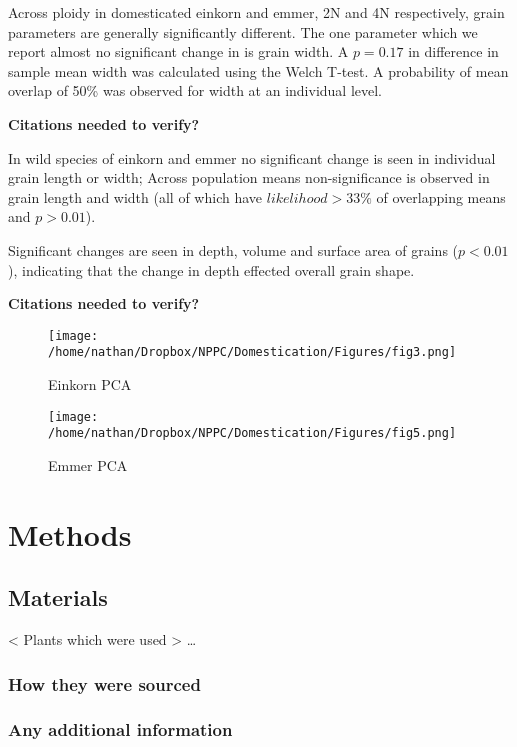 \documentclass[a4paper]{article}
\begin{document}
Across ploidy in domesticated einkorn and emmer, 2N and 4N respectively, grain parameters are generally significantly different. The one parameter which
we report almost no significant change in is grain width. A \(p=0.17\) in difference in sample mean width was calculated using the Welch T-test. A probability of mean overlap of 50\%
was observed for width at an individual level.

\textbf{Citations needed to verify?}


In wild species of einkorn and emmer no significant change is seen in individual grain length or width;
Across population means non-significance is observed in grain length and width (all of which have \(likelihood > 33\%\) of overlapping means and \(p>0.01\)).

Significant changes are seen in depth, volume and surface area of grains (\(p<0.01\)), indicating that the change in depth effected overall grain shape.

\textbf{Citations needed to verify?}

\begin{figure}[htbp]
\centering
\texttt{[image: /home/nathan/Dropbox/NPPC/Domestication/Figures/fig3.png]}
\caption{\label{fig:orgba8a8b4}
Einkorn PCA}
\end{figure}

\begin{figure}[htbp]
\centering
\texttt{[image: /home/nathan/Dropbox/NPPC/Domestication/Figures/fig5.png]}
\caption{\label{fig:org77d5d95}
Emmer PCA}
\end{figure}


\section{Methods}
\label{sec:org2468c2a}
\subsection{Materials}
\label{sec:org495e4d9}
< Plants which were used > \ldots{}
\subsubsection{How they were sourced}
\label{sec:orgfbbe8e8}
\subsubsection{Any additional information}
\label{sec:org2f52b19}
\end{document}

